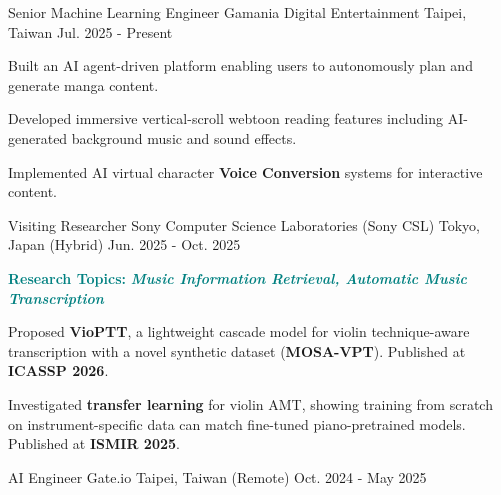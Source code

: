 

\begin{cventries}

 \cventry
 {Senior Machine Learning Engineer}
 {Gamania Digital Entertainment}
 {Taipei, Taiwan}
 {Jul. 2025 - Present}
 {
     \begin{cvitems}
         \item {Built an AI agent-driven platform enabling users to autonomously plan and generate manga content.}
         \item {Developed immersive vertical-scroll webtoon reading features including AI-generated background music and sound effects.}
         \item {Implemented AI virtual character \textbf{Voice Conversion} systems for interactive content.}
     \end{cvitems}
 }

 \cventry
 {Visiting Researcher}
 {Sony Computer Science Laboratories (Sony CSL)}
 {Tokyo, Japan (Hybrid)}
 {Jun. 2025 - Oct. 2025}
 {
     \begin{cvitems}
         \item[] \footnotesize\textbf{\textcolor{teal}{Research Topics:}} \textit{\textcolor{teal}{\textbf{Music Information Retrieval, Automatic Music Transcription}}}
         \item {Proposed \textbf{VioPTT}, a lightweight cascade model for violin technique-aware transcription with a novel synthetic dataset (\textbf{MOSA-VPT}). Published at \textbf{ICASSP 2026}.}
         \item {Investigated \textbf{transfer learning} for violin AMT, showing training from scratch on instrument-specific data can match fine-tuned piano-pretrained models. Published at \textbf{ISMIR 2025}.}
     \end{cvitems}
 }

 \cventry
 {AI Engineer}
 {Gate.io}
 {Taipei, Taiwan (Remote)}
 {Oct. 2024 - May 2025}
 {}


\end{cventries}
